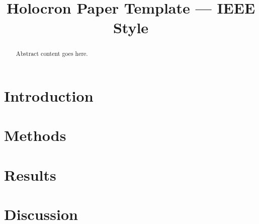 \documentclass[conference]{IEEEtran}
\title{Holocron Paper Template — IEEE Style}
\author{\IEEEauthorblockN{Author Name}}
\begin{document}
\maketitle
\begin{abstract}
Abstract content goes here.
\end{abstract}
\section{Introduction}
\section{Methods}
\section{Results}
\section{Discussion}


\end{document}
